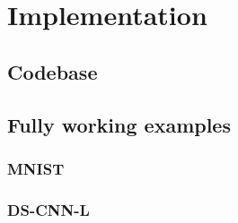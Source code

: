 \chapter{Implementation}
\lipsum[1]

\section{Codebase}
\lipsum[1]

\section{Fully working examples}
\lipsum[1]

\subsection{MNIST}
\lipsum[1]

\subsection{DS-CNN-L}
\lipsum[1]
